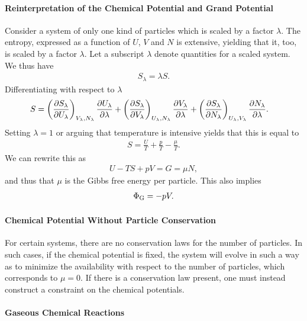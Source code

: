\paragraph{Reinterpretation of the Chemical Potential and Grand Potential}
Consider a system of only one kind of particles which is scaled by a factor $\lambda$. The entropy, expressed as a function of $U$, $V$ and $N$ is extensive, yielding that it, too, is scaled by a factor $\lambda$. Let a subscript $\lambda$ denote quantities for a scaled system. We thus have
\begin{align*}
	S_{\lambda} = \lambda S.
\end{align*}
Differentiating with respect to $\lambda$ 
\begin{align*}
	S &= \left(\pdv{S_{\lambda}}{U_{\lambda}}\right)_{V_{\lambda}, N_{\lambda}}\pdv{U_{\lambda}}{\lambda} + \left(\pdv{S_{\lambda}}{V_{\lambda}}\right)_{U_{\lambda}, N_{\lambda}}\pdv{V_{\lambda}}{\lambda} + \left(\pdv{S_{\lambda}}{N_{\lambda}}\right)_{U_{\lambda}, V_{\lambda}}\pdv{N_{\lambda}}{\lambda}.
\end{align*}
Setting $\lambda = 1$ or arguing that temperature is intensive yields that this is equal to
\begin{align*}
	S = \frac{U}{T} + \frac{p}{T} - \frac{\mu}{T}. 
\end{align*}
We can rewrite this as
\begin{align*}
	U - TS + pV = G = \mu N,
\end{align*}
and thus that $\mu$ is the Gibbs free energy per particle. This also implies
\begin{align*}
	\Phi_{\text{G}} = -pV.
\end{align*}


\paragraph{Chemical Potential Without Particle Conservation}
For certain systems, there are no conservation laws for the number of particles. In such cases, if the chemical potential is fixed, the system will evolve in such a way as to minimize the availability with respect to the number of particles, which corresponds to $\mu = 0$. If there is a conservation law present, one must instead construct a constraint on the chemical potentials.

\paragraph{Gaseous Chemical Reactions}

